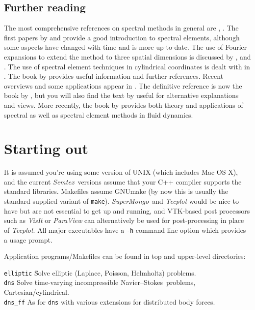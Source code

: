 \documentclass[11pt,a4paper]{report}
\newcommand{\Semtex}{\emph{Semtex}}
\newcommand{\SM}{\emph{SuperMongo}}
\newcommand\NavSto{Navier--Stokes}
\begin{document}
\section{Further reading}

The most comprehensive references on spectral methods in general are
\citet{gs77}, \citet{chqz88,chqz06}.  The first papers by
\citet{pat84} and \citet{kp86} provide a good introduction to spectral
elements, although some aspects have changed with time and
\citet{mt89} is more up-to-date.  The use of Fourier expansions to
extend the method to three spatial dimensions is discussed by
\citet{ap89}, \citet{kar89} and \citet{kar90}.  The use of spectral
element techniques in cylindrical coordinates is dealt with in
\citet{blsh04}.  The book by \citet{fun97} provides useful information
and further references.  Recent overviews and some applications appear
in \citet{kh98,hen99b}.  The definitive reference is now the book by
\citet{kars05}, but you will also find the text by \citet*{dfm02}
useful for alternative explanations and views. More recently, the book
by \citet{chqz07} provides both theory and applications of spectral as
well as spectral element methods in fluid dynamics.

\chapter{Starting out}

It is assumed you're using some version of UNIX (which includes Mac OS
X), and the current \Semtex\ versions assume that your C++ compiler
supports the standard libraries. Makefiles assume GNUmake (by now this
is usually the standard supplied variant of \texttt{make}).
\SM\ and \emph{Tecplot} would be nice to have but are not
essential to get up and running, and VTK-based post processors such as
\emph{VisIt} or \emph{ParaView} can alternatively be used for
post-processing in place of \emph{Tecplot}. All major executables have
a \texttt{-h} command line option which provides a usage prompt.

Application programs/Makefiles can be found in top and upper-level
directories:
\begin{tabbing}
\texttt{elliptic} \= Solve elliptic (Laplace, Poisson, Helmholtz)
problems.\\ \texttt{dns} \> Solve time-varying incompressible
\NavSto\ problems, Cartesian/cylindrical.\\ \texttt{dns\_ff} \> As for
\verb|dns| with various extensions for distributed body forces.\\
\end{tabbing}
\end{document}
